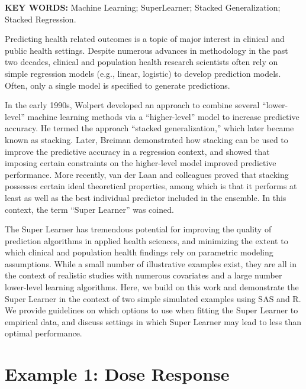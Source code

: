 \documentclass[12pt]{article}
\begin{document}
%
%
%
\baselineskip=12pt
\par\vfill\noindent
{\bf KEY WORDS:} Machine Learning; SuperLearner; Stacked Generalization; Stacked Regression.

\par\medskip\noindent
%
%
%
%
%
%
%
%
%
%
%
%
%
%
%
%
%
%
%
%
%
%
%
%
%
\newpage
\doublespacing
\linenumbers
\setcounter{page}{1}

Predicting health related outcomes is a topic of major interest in clinical and public health settings. Despite numerous advances in methodology in the past two decades, clinical and population health research scientists often rely on simple regression models (e.g., linear, logistic) to develop prediction models. Often, only a single model is specified to generate predictions.

In the early 1990s, Wolpert developed an approach to combine several ``lower-level'' machine learning methods via a ``higher-level'' model to increase predictive accuracy.\cite{Wolpert1992} He termed the approach ``stacked generalization,'' which later became known as stacking. Later, Breiman demonstrated how stacking can be used to improve the predictive accuracy in a regression context, and showed that imposing certain constraints on the higher-level model improved predictive performance.\cite{Breiman1996} More recently, van der Laan and colleagues proved that stacking possesses certain ideal theoretical properties, among which is that it performs at least as well as the best individual predictor included in the ensemble.\cite{vanderLaan2006a,vanderLaan2007} In this context, the term ``Super Learner'' was coined.

The Super Learner has tremendous potential for improving the quality of prediction algorithms in applied health sciences, and minimizing the extent to which clinical and population health findings rely on parametric modeling assumptions. While a small number of illustrative examples exist, they are all in the context of realistic studies with numerous covariates and a large number lower-level learning algorithms.\cite{Rose2013,Rose2011} Here, we build on this work and demonstrate the Super Learner in the context of two simple simulated examples using SAS and R. We provide guidelines on which options to use when fitting the Super Learner to empirical data, and discuss settings in which Super Learner may lead to less than optimal performance.

\section*{Example 1: Dose Response}
\end{document}

